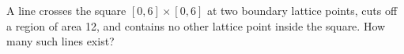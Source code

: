A line crosses the square $[0,6]\times[0,6]$ at two boundary lattice points, cuts off a region of area 12, and contains no other lattice point inside the square. How many such lines exist?
